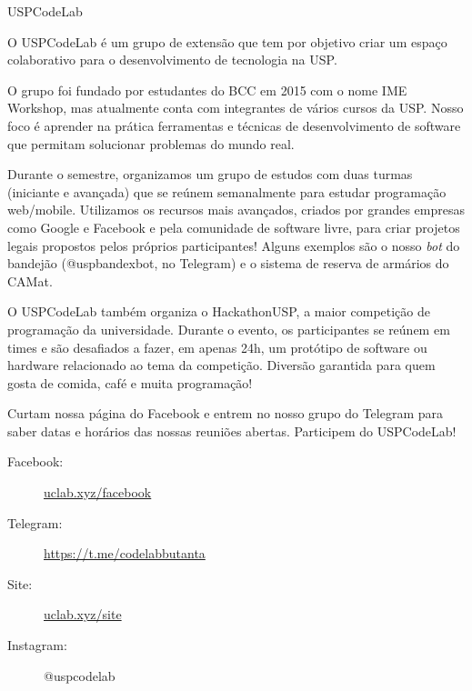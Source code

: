 \begin{subsecao}{USPCodeLab}


O USPCodeLab é um grupo de extensão que tem por objetivo criar um espaço
colaborativo para o desenvolvimento de tecnologia na USP.

O grupo foi fundado por estudantes do BCC em 2015 com o nome IME Workshop, mas
atualmente conta com integrantes de vários cursos da USP. Nosso foco é aprender
na prática ferramentas e técnicas de desenvolvimento de software que permitam
solucionar problemas do mundo real.

Durante o semestre, organizamos um grupo de estudos com duas turmas (iniciante
e avançada) que se reúnem semanalmente para estudar programação web/mobile.
Utilizamos os recursos mais avançados, criados por grandes empresas como Google
e Facebook e pela comunidade de software livre, para criar projetos legais
propostos pelos próprios participantes! Alguns exemplos são o nosso \textit{bot}
do bandejão (@uspbandexbot, no Telegram) e o sistema de reserva de armários do
CAMat.

O USPCodeLab também organiza o HackathonUSP, a maior competição de programação
da universidade. Durante o evento, os participantes se reúnem em times e são
desafiados a fazer, em apenas 24h, um protótipo de software ou hardware
relacionado ao tema da competição. Diversão garantida para quem gosta de comida,
café e muita programação!

Curtam nossa página do Facebook e entrem no nosso grupo do Telegram para saber
datas e horários das nossas reuniões abertas. Participem do USPCodeLab!

\begin{description}
\item[Facebook:] \url{uclab.xyz/facebook}
\item[Telegram:] \url{https://t.me/codelabbutanta}
\item[Site:] \url{uclab.xyz/site}
\item[Instagram:] @uspcodelab
\end{description}

\end{subsecao}
